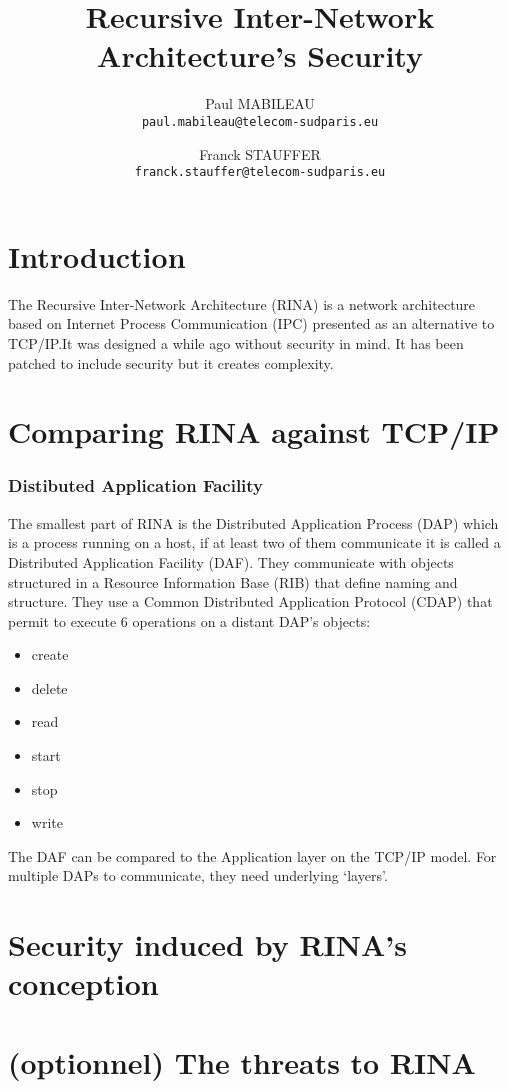 \documentclass[a4paper]{proc}
\author{Paul MABILEAU\\\texttt{paul.mabileau@telecom-sudparis.eu} \and Franck STAUFFER\\\texttt{franck.stauffer@telecom-sudparis.eu}}
\title{\textbf{Recursive Inter-Network Architecture's Security}}
\begin{document}
\maketitle
\tableofcontents
\newpage
\part*{Introduction}
The Recursive Inter-Network Architecture (RINA) is a network architecture based on Internet Process Communication
(IPC) presented as an alternative to TCP/IP.\@ It was designed a while ago without security in mind. It has been
patched to include security but it creates complexity.\cite{assessing-security}

\part{Comparing RINA against TCP/IP}
\section{Distibuted Application Facility}
The smallest part of RINA is the Distributed Application Process (DAP) which is a process running on a host,
if at least two of them communicate it is called a Distributed Application Facility (DAF). They communicate 
with objects structured in a Resource Information Base (RIB) that define naming and structure. They use
a Common Distributed Application Protocol (CDAP) that permit to execute 6 operations on a distant DAP's
objects:
\begin{itemize}
\item create
\item delete
\item read
\item start
\item stop
\item write
\end{itemize}
The DAF can be compared to the Application layer on the TCP/IP model. For multiple DAPs to communicate, they 
need underlying `layers'.\cite{wiki}

\part{Security induced by RINA's conception}

\part{(optionnel) The threats to RINA}

\nocite{*}
\newpage


\end{document}
